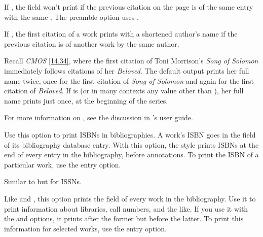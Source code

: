 \documentclass[11pt,letterpaper,oneside]{article}
\begin{document}
\begin{optionlist}
\noindent If , the  field won't print if
the previous citation on the page is of the same entry with the same
. The  preamble option uses
.


\noindent If , the first citation of a work prints with a
shortened author's name if the previous citation is of another work by
the same author.

Recall \textit{CMOS} \ref{14.34}, where the first citation of Toni
Morrison's \textit{Song of Solomon} immediately follows citations of
her \textit{Beloved}. The default output prints her full name twice,
once for the first citation of \textit{Song of Solomon} and again for
the first citation of \textit{Beloved}. If  is
 (or in many contexts any value other than ), her
full name prints just once, at the beginning of the series.


For more information on , see the discussion in
\biblatex's user guide.


\noindent Use this option to print ISBNs in bibliographies. A work's
ISBN goes in the  field of its bibliography database
entry. With this option, the style prints ISBNs at the end of every
entry in the bibliography, before annotations. To print the ISBN of a
particular work, use the  entry option.


\noindent Similar to  but for ISSNs.


\noindent Like  and , this option prints the
 field of every work in the bibliography. Use it to
print information about libraries, call numbers, and the like. If you
use it with the  and  options, it prints
after the former but before the latter. To print this information for
selected works, use the  entry option.



\end{optionlist}
\end{document}
